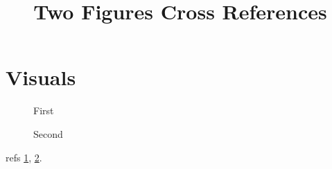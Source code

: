 \documentclass{article}
\begin{document}
\title{Two Figures Cross References}\maketitle
\section{Visuals}\begin{figure}[h]\centering{}\caption{First}\label{fig:one}\end{figure}\begin{figure}[h]\centering{}\caption{Second}\label{fig:two}\end{figure} refs \ref{fig:one}, \ref{fig:two}.
\end{document}
